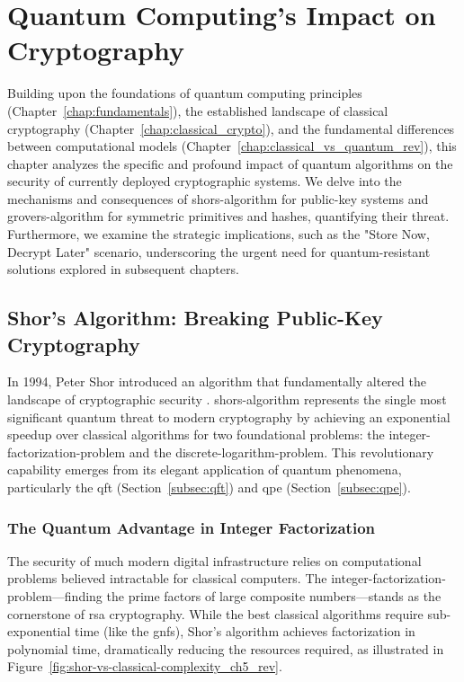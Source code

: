 \chapter{Quantum Computing's Impact on Cryptography}\label{chap:quantum_impact}

Building upon the foundations of quantum computing principles (Chapter~\ref{chap:fundamentals}), the established landscape of classical cryptography (Chapter~\ref{chap:classical_crypto}), and the fundamental differences between computational models (Chapter~\ref{chap:classical_vs_quantum_rev}), this chapter analyzes the specific and profound impact of quantum algorithms on the security of currently deployed cryptographic systems. We delve into the mechanisms and consequences of \gls{shors-algorithm} for public-key systems and \gls{grovers-algorithm} for symmetric primitives and hashes, quantifying their threat. Furthermore, we examine the strategic implications, such as the "Store Now, Decrypt Later" scenario, underscoring the urgent need for quantum-resistant solutions explored in subsequent chapters.


\section{Shor's Algorithm: Breaking Public-Key Cryptography}\label{sec:shors_impact_ch5_rev}

In 1994, Peter Shor introduced an algorithm that fundamentally altered the landscape of cryptographic security \parencite{shor1994algorithms}. \Gls{shors-algorithm} represents the single most significant quantum threat to modern cryptography by achieving an exponential speedup over classical algorithms for two foundational problems: the \gls{integer-factorization-problem} and the \gls{discrete-logarithm-problem}. This revolutionary capability emerges from its elegant application of quantum phenomena, particularly the \gls{qft} (Section~\ref{subsec:qft}) and \gls{qpe} (Section~\ref{subsec:qpe}).

\subsection{The Quantum Advantage in Integer Factorization}\label{subsec:shors}

The security of much modern digital infrastructure relies on computational problems believed intractable for classical computers. The \gls{integer-factorization-problem}—finding the prime factors of large composite numbers—stands as the cornerstone of \gls{rsa} cryptography. While the best classical algorithms require sub-exponential time (like the \gls{gnfs}), Shor's algorithm achieves factorization in polynomial time, dramatically reducing the resources required, as illustrated in Figure~\ref{fig:shor-vs-classical-complexity_ch5_rev}.

